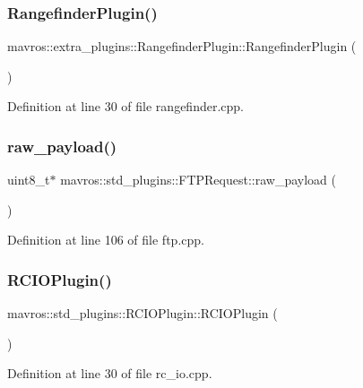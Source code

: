 \subsubsection{\texorpdfstring{RangefinderPlugin()}{RangefinderPlugin()}}
{\footnotesize\ttfamily mavros\+::extra\+\_\+plugins\+::\+Rangefinder\+Plugin\+::\+Rangefinder\+Plugin (\begin{DoxyParamCaption}{ }\end{DoxyParamCaption})\hspace{0.3cm}{\ttfamily [inline]}}



Definition at line 30 of file rangefinder.\+cpp.

\mbox{\label{group__plugin_ga5db0f34c632d274bb013df23cb8aa362}} 
\subsubsection{\texorpdfstring{raw\_payload()}{raw\_payload()}}
{\footnotesize\ttfamily uint8\+\_\+t$\ast$ mavros\+::std\+\_\+plugins\+::\+F\+T\+P\+Request\+::raw\+\_\+payload (\begin{DoxyParamCaption}{ }\end{DoxyParamCaption})\hspace{0.3cm}{\ttfamily [inline]}}



Definition at line 106 of file ftp.\+cpp.

\mbox{\label{group__plugin_gaabbdf318dd1876ca9ed7c2d09ced9c4e}} 
\subsubsection{\texorpdfstring{RCIOPlugin()}{RCIOPlugin()}}
{\footnotesize\ttfamily mavros\+::std\+\_\+plugins\+::\+R\+C\+I\+O\+Plugin\+::\+R\+C\+I\+O\+Plugin (\begin{DoxyParamCaption}{ }\end{DoxyParamCaption})\hspace{0.3cm}{\ttfamily [inline]}}



Definition at line 30 of file rc\+\_\+io.\+cpp.

\mbox{\label{group__plugin_gac53ce1e6ed02e01c3a2db41478d69452}} 
